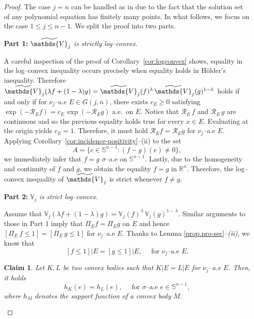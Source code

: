 \documentclass[11pt]{article}
\newtheorem{claim}[theorem]{Claim}
\theoremstyle{definition}
\numberwithin{equation}{section}
\newcommand{\R}{\mathbb{R}}
\newcommand{\Sph}{\mathbb{S}}        %
\newcommand{\Gr}[2]{G(#1,#2)}        %
\newcommand{\opV}{\mathds{V}}       %
\begin{document}
\begin{proof}
The case $j = n$ can be handled as in \cite[Theorem 2.4]{La_2015} due to the fact that the solution set of any polynomial equation has finitely many points.
In what follows, we focus on the case $1 \leq j \leq n - 1$.
We split the proof into two parts.

\smallskip

\textbf{Part 1:} \textit{$\widetilde\opV_j$ is strictly log--convex.}

\smallskip

A careful inspection of the proof of Corollary~\ref{cor:logconvex} shows, equality in the log–convex inequality occurs precisely when equality holds in Hölder’s inequality.
Therefore $\widetilde \opV_j(\lambda f+(1-\lambda)g)
= \widetilde \opV_j(f)^\lambda\,\widetilde \opV_j(g)^{1-\lambda}$ holds if and only if for $\nu_j$--a.e $E \in \Gr{j}{n}$, there exists $c_E \geq 0$ satisfying $\exp(-\mathscr R_E f) = c_E\, \exp(-\mathscr R_E g)$ a.e.\ on $E$.
Notice that $\mathscr R_E \, f$ and $\mathscr R_E \, g$ are continuous and so the previous equality holds true for every  $x \in E$. 
Evaluating at the origin yields $c_E =  1$.
Therefore, it must hold $\mathscr R_E f = \mathscr R_E g$ for $\nu_j$--a.e $E$.
Applying Corollary~\ref{cor:incidence-positivity}--(ii) to the set 
\[
A = \{ e \in \Sph^{n - 1}: (f - g)(e) \neq 0 \},
\]
we immediately infer that $f = g$ $\sigma$--a.e on $\Sph^{n - 1}$. 
Lastly, due to the homogeneity and continuity of $f$ and $g$, we obtain the equality $f = g$ in $\R^n$.
Therefore, the log--convex inequality of $\widetilde \opV_j$ is strict whenever $f \neq g$. 

\medskip

\textbf{Part 2:} \textit{$\opV_j$ is strict log--convex.}

\smallskip

Assume that  $\opV_j(\lambda f+(1-\lambda)g)
= \opV_j(f)^\lambda\, \opV_j(g)^{1-\lambda}$.
Similar arguments to those in Part 1 imply that $\Pi_E f = \Pi_E g$ on $E$ and hence $[ \Pi_E \, f \leq 1 ] = [\Pi_E \,  g \leq 1]$ for $\nu_j$--a.e $E$.
Thanks to Lemma \ref{prop.pro-sec}--\textit{(ii)}, we know that 
\[
[f \leq 1] \vert E = [g \leq 1] \vert E, \quad \text{ for $\nu_j$--a.e $E$}.
\]

\begin{claim}\label{claim.supp-proj}
Let $K, L$ be two convex bodies such that $K \vert E = L \vert E$ for $\nu_j$--a.e $E$.
Then, it holds 
\[
	h_K(e) = h_L(e), \quad \text{ for $\sigma$--a.e $e \in \mathbb S^{n - 1}$},
\]
where $h_M$ denotes the support function of a convex body $M$.
\end{claim}


\end{proof}
\end{document}
